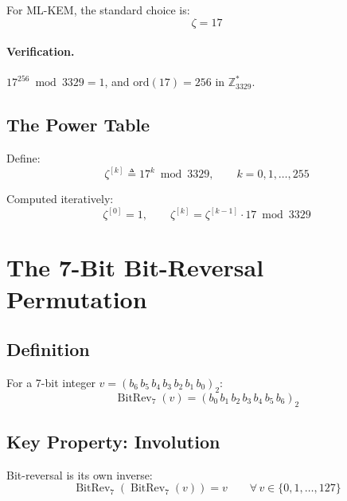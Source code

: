 \documentclass[11pt,a4paper]{article}
\newcommand{\brev}[1]{\operatorname{BitRev}_{7}\!\left(#1\right)}
\begin{document}
For ML-KEM, the standard choice is:
\begin{equation}
  \boxed{\zeta = 17}
\end{equation}

\paragraph{Verification.}
$17^{256} \bmod 3329 = 1$, and $\text{ord}(17) = 256$ in $\mathbb{Z}_{3329}^{*}$.

\subsection{The Power Table}

Define:
\begin{equation}
  \zeta^{[k]} \triangleq 17^{k} \bmod 3329, \qquad k = 0, 1, \ldots, 255
\end{equation}

Computed iteratively:
\begin{equation}
  \zeta^{[0]} = 1, \qquad \zeta^{[k]} = \zeta^{[k-1]} \cdot 17 \bmod 3329
\end{equation}

\section{The 7-Bit Bit-Reversal Permutation}

\subsection{Definition}

For a 7-bit integer $v = (b_6\, b_5\, b_4\, b_3\, b_2\, b_1\, b_0)_2$:
\begin{equation}
  \brev{v} = (b_0\, b_1\, b_2\, b_3\, b_4\, b_5\, b_6)_2
  \label{eq:bitrev-def}
\end{equation}

\subsection{Key Property: Involution}

Bit-reversal is its own inverse:
\begin{equation}
  \brev{\brev{v}} = v \qquad \forall\, v \in \{0, 1, \ldots, 127\}
  \label{eq:involution}
\end{equation}
\end{document}
